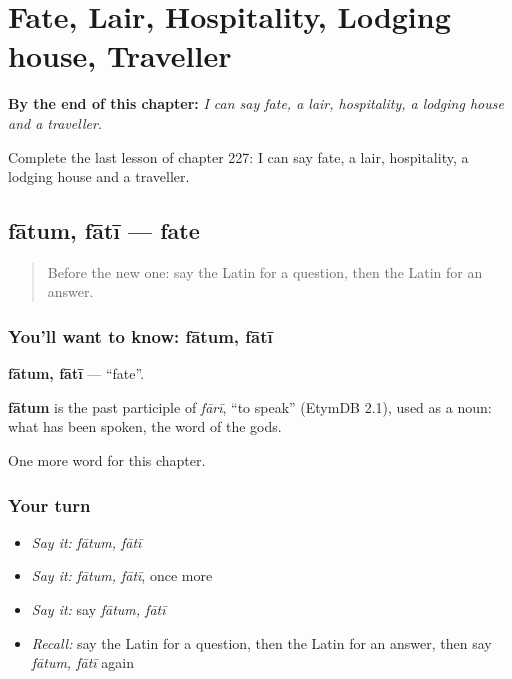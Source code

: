 
\chapter{Fate, Lair, Hospitality, Lodging house, Traveller}
\label{ch:la-fate-lair-hospitality-lodging-house-traveller}

\begin{chapteropening}
\textbf{By the end of this chapter:} \emph{I can say fate, a lair, hospitality, a lodging house and a traveller.}

Complete the last lesson of chapter 227: I can say fate, a lair, hospitality, a lodging house and a traveller.
\end{chapteropening}

\section[fātum, fātī]{fātum, fātī — fate}

\label{lesson:LA-C227-fatum}



\begin{quote}
Before the new one: say the Latin for a question, then the Latin for an answer.
\end{quote}

\subsection*{You'll want to know: fātum, fātī}
\textbf{fātum, fātī} — \textquotedblleft{}fate\textquotedblright{}.

\begin{cousinweb}
\textbf{fātum} is the past participle of \emph{fārī}, \textquotedblleft{}to speak\textquotedblright{} (EtymDB 2.1), used as a noun: what has been spoken, the word of the gods.
\end{cousinweb}

\begin{grammarlens}[title={What you've built}]
One more word for this chapter.
\end{grammarlens}

\subsection*{Your turn}
\begin{itemize}
\raggedright
  \item \emph{Say it:} \emph{fātum, fātī}
  \item \emph{Say it:} \emph{fātum, fātī}, once more
  \item \emph{Say it:} say \emph{fātum, fātī}
  \item \emph{Recall:} say the Latin for a question, then the Latin for an answer, then say \emph{fātum, fātī} again
\end{itemize}

